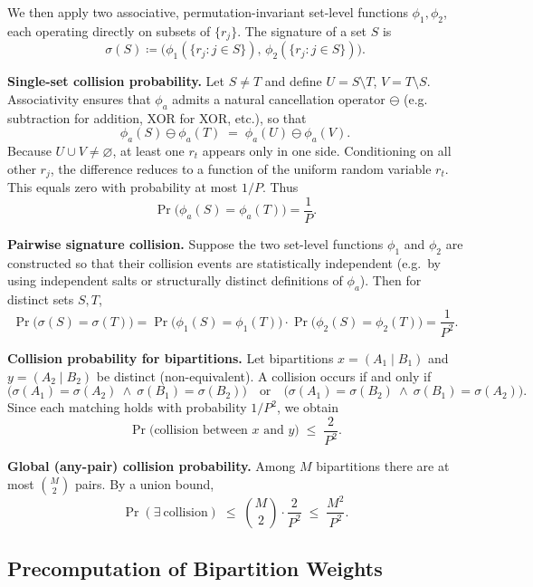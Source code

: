\documentclass[10pt,a4paper]{article}
\begin{document}
We then apply two associative, permutation-invariant set-level functions $\phi_1,\phi_2$, each operating directly on subsets of $\{r_j\}$. The signature of a set $S$ is
\[
\sigma(S) \coloneqq \big(\phi_1(\{r_j:j\in S\}),\, \phi_2(\{r_j:j\in S\})\big).
\]

\textbf{Single-set collision probability.}  
Let $S\neq T$ and define $U=S\setminus T$, $V=T\setminus S$. Associativity ensures that $\phi_a$ admits a natural cancellation operator $\ominus$ (e.g. subtraction for addition, XOR for XOR, etc.), so that
\[
\phi_a(S)\ominus\phi_a(T) \;=\; \phi_a(U)\ominus\phi_a(V).
\]
Because $U\cup V\neq\varnothing$, at least one $r_t$ appears only in one side. Conditioning on all other $r_j$, the difference reduces to a function of the uniform random variable $r_t$. This equals zero with probability at most $1/P$. Thus
\begin{equation}\label{eq:single-hash}
\Pr\big(\phi_a(S)=\phi_a(T)\big) = \frac{1}{P}.
\end{equation}

\textbf{Pairwise signature collision.}  
Suppose the two set-level functions $\phi_1$ and $\phi_2$ are constructed so that their collision events are statistically independent (e.g.\ by using independent salts or structurally distinct definitions of $\phi_a$). Then for distinct sets $S,T$,
\[
\Pr\big(\sigma(S)=\sigma(T)\big)
= \Pr\big(\phi_1(S)=\phi_1(T)\big)\cdot \Pr\big(\phi_2(S)=\phi_2(T)\big)
= \frac{1}{P^2}.
\]



\textbf{Collision probability for bipartitions.}  
Let bipartitions $x=(A_1 \mid B_1)$ and $y=(A_2 \mid B_2)$ be distinct (non-equivalent).  
A collision occurs if and only if
\[
\big(\sigma(A_1)=\sigma(A_2)\ \wedge\ \sigma(B_1)=\sigma(B_2)\big)
\quad\text{or}\quad
\big(\sigma(A_1)=\sigma(B_2)\ \wedge\ \sigma(B_1)=\sigma(A_2)\big).
\]
Since each matching holds with probability $1/P^2$, we obtain
\[
\Pr\!\big(\text{collision between }x\text{ and }y\big) \;\le\; \frac{2}{P^2}.
\]




\textbf{Global (any-pair) collision probability.}  
Among $M$ bipartitions there are at most $\binom{M}{2}$ pairs. By a union bound,
\[
\Pr(\exists\ \text{collision}) \;\le\; \binom{M}{2}\cdot \frac{2}{P^2}
\;\le\; \frac{M^2}{P^2}.
\]






\subsection{Precomputation of Bipartition Weights}
\label{subsec:weight-precomp}
\end{document}
